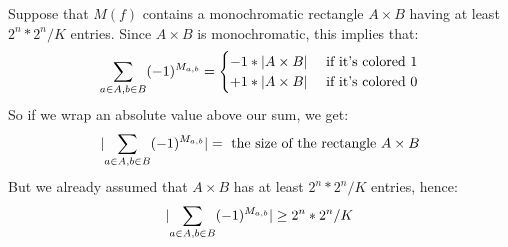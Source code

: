 Suppose that $M(f)$ contains a monochromatic rectangle $A \times B$ having at least $2^n * 2^n / K$ entries.
\pause
Since $A \times B$ is monochromatic, this implies that:
\[\sum_{a \in A, b \in B} (-1)^{M_{a,b}} = \begin{cases}
-1 * \lvert A \times B\rvert & \text{ if it's colored } 1 \\
+1 * \lvert A \times B\rvert & \text{ if it's colored } 0\end{cases}\]
\pause
So if we wrap an absolute value above our sum, we get:
\[\lvert\sum_{a \in A, b \in B} (-1)^{M_{a,b}}\rvert = \text{ the size of the rectangle } A \times B\]
\pause
But we already assumed that $A \times B$ has at least $2^n * 2^n / K$ entries, hence:
\[\lvert\sum_{a \in A, b \in B} (-1)^{M_{a,b}}\rvert \geq 2^n * 2^n / K\]
